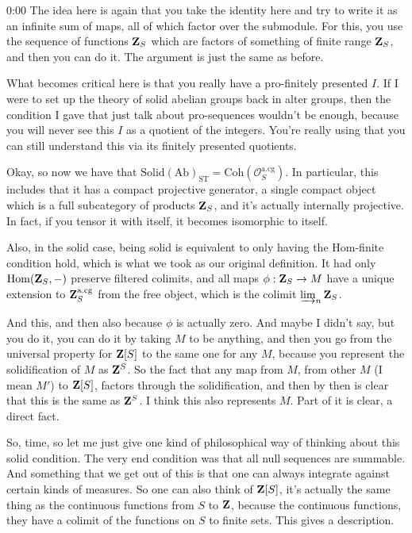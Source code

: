 \begin{unfinished}{0:00}
The idea here is again that you take the identity here and try to write it as an infinite sum of maps, all of which factor over the submodule. For this, you use the sequence of functions $\mathbf Z_S$ which are factors of something of finite range $\mathbf Z_S$, and then you can do it. The argument is just the same as before.

What becomes critical here is that you really have a pro-finitely presented $I$. If I were to set up the theory of solid abelian groups back in alter groups, then the condition I gave that just talk about pro-sequences wouldn't be enough, because you will never see this $I$ as a quotient of the integers. You're really using that you can still understand this via its finitely presented quotients.

Okay, so now we have that $\mathrm{Solid}(\mathrm{Ab})_{\mathrm{ST}} = \mathrm{Coh}(\mathcal{O}_S^\mathrm{a.cg})$. In particular, this includes that it has a compact projective generator, a single compact object which is a full subcategory of products $\mathbf Z_S$, and it's actually internally projective. In fact, if you tensor it with itself, it becomes isomorphic to itself.

Also, in the solid case, being solid is equivalent to only having the $\mathrm{Hom}$-finite condition hold, which is what we took as our original definition. It had only $\mathrm{Hom}(\mathbf Z_S,-)$ preserve filtered colimits, and all maps $\phi : \mathbf Z_S \to M$ have a unique extension to $\mathbf Z_S^{\mathrm{a.cg}}$ from the free object, which is the colimit $\varinjlim_n \mathbf Z_S$.

And this, and then also because $\phi$ is actually zero. And maybe I didn't say, but you do it, you can do it by taking $M$ to be anything, and then you go from the universal property for $\mathbf Z[S]$ to the same one for any $M$, because you represent the solidification of $M$ as $\mathbf Z^S$. So the fact that any map from $M$, from other $M$ (I mean $M'$) to $\mathbf Z[S]$, factors through the solidification, and then by then is clear that this is the same as $\mathbf Z^S$. I think this also represents $M$. Part of it is clear, a direct fact.

So, time, so let me just give one kind of philosophical way of thinking about this solid condition. The very end condition was that all null sequences are summable. And something that we get out of this is that one can always integrate against certain kinds of measures. So one can also think of $\mathbf Z[S]$, it's actually the same thing as the continuous functions from $S$ to $\mathbf Z$, because the continuous functions, they have a colimit of the functions on $S$ to finite sets. This gives a description.


\end{unfinished}
